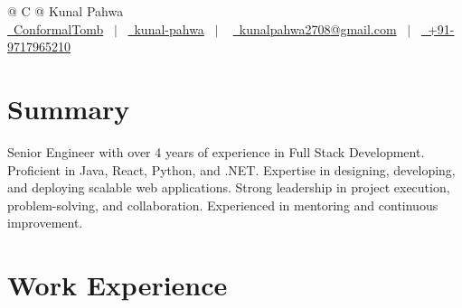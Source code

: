 \documentclass[a4paper,12pt]{article}
\begin{document}
\pagestyle{empty} 



\begin{tabularx}{\linewidth}{@{} C @{}}
\Huge{Kunal Pahwa} \\[7.5pt]
\href{https://github.com/ConformalTomb}{\raisebox{-0.05\height}\faGithub\ ConformalTomb} \ $|$ \ 
\href{https://www.linkedin.com/in/kunal-pahwa}{\raisebox{-0.05\height}\faLinkedin\ kunal-pahwa} \ $|$ \ 
\href{mailto:kunalpahwa2708@gmail.com}{\raisebox{-0.05\height}\faEnvelope \ kunalpahwa2708@gmail.com} \ $|$ \ 
\href{tel:+91-9717965210}{\raisebox{-0.05\height}\faMobile \ +91-9717965210} \\
\end{tabularx}


\section{Summary}
Senior Engineer with over 4 years of experience in Full Stack Development. Proficient in Java, React, Python, and .NET. Expertise in designing, developing, and deploying scalable web applications. Strong leadership in project execution, problem-solving, and collaboration. Experienced in mentoring and continuous improvement.

\section{Work Experience}
\end{document}
